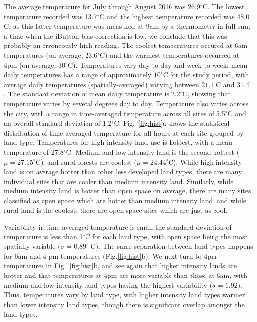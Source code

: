 The average temperature for July through August 2016 
was 26.9$^\circ$C. 
The lowest temperature recorded was 13.7$^\circ$C and the highest temperature recorded was 48.0$^\circ $C; as this latter temperature was measured at 9am by a thermometer in full sun, a time when the iButton bias correction is low, we conclude that this was probably an erroneously high reading.
The coolest temperatures occured at 6am temperatures (on average, 23.6$^\circ$C) and the warmest temperatures occurred at 4pm (on average,  30$^\circ$C). 
Temperatures vary day to day and week to week: mean daily temperatures has a range of approximately $10^\circ$C for the study period, with average daily temperatures (spatially-averaged) varying between $21.1^\circ$C and $31.4^\circ$. The standard deviation of mean daily temperature is $2.2^\circ$C, showing that temperature varies by several degrees day to day. 
Temperature also varies across the city, with a range in time-averaged temperature across all sites of 5.5$^\circ$C and an overall standard deviation of 1.2$^\circ$C. Fig.~\ref{fig:hist}a shows the statistical distribution of time-averaged temperature for all hours at each site grouped by land type. 
Temperatures %
for high intensity land use is hottest, with a mean temperature of 27.8$^\circ$C. Medium and low intensity land is the second hottest ($\mu = 27.15^\circ$C), and rural forests are coolest ($\mu = 24.44^\circ$C). While high intensity land is on average hotter than other less developed land types, there are many individual sites that are cooler than medium intensity land. Similarly, while medium intensity land is hotter than open space on average, there are many sites classified as open space which are hotter than medium intensity land, and while rural land is the coolest, there are open space sites which are just as cool. 

Variability in time-averaged temperature is small-the standard deviation of temperature is less than 1$^\circ$C for each land type, with open space being the most spatially variable ($\sigma = 0.89^\circ$ C). 
The same separation between land types happens for 6am and 4 pm temperatures (Fig.\ref{fig:hist}b).
 We next turn to 4pm temperatures in Fig.~\ref{fig:hist}b, and see again that higher intensity lands are hotter and that temperatures at 4pm are more variable than those at 6am, with medium and low intensity land types having the highest variability ($\sigma = 1.92$). 
Thus, temperatures vary by land type, with higher intensity land types  warmer than lower intensity land types, 
though there is significant overlap amongst the land types.

